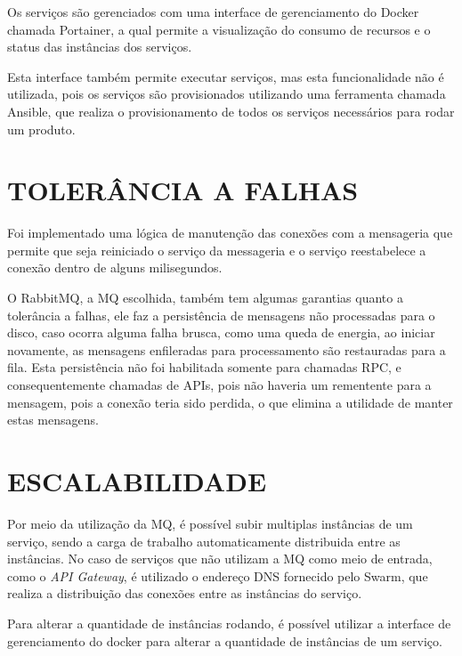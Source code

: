 Os serviços são gerenciados com uma interface de gerenciamento do Docker chamada
Portainer, a qual permite a visualização do consumo de recursos e o status das
instâncias dos serviços.

Esta interface também permite executar serviços, mas esta funcionalidade não é
utilizada, pois os serviços são provisionados utilizando uma ferramenta chamada
Ansible, que realiza o provisionamento de todos os serviços necessários para
rodar um produto.

\section{TOLERÂNCIA A FALHAS}

Foi implementado uma lógica de manutenção das conexões com a mensageria que permite
que seja reiniciado o serviço da messageria e o serviço reestabelece a conexão dentro
de alguns milisegundos.

O RabbitMQ, a \ac{MQ} escolhida, também tem algumas garantias quanto a tolerância a
falhas, ele faz a persistência de mensagens não processadas para o disco, caso ocorra
alguma falha brusca, como uma queda de energia, ao iniciar novamente, as mensagens
enfileradas para processamento são restauradas para a fila. Esta persistência não foi
habilitada somente para chamadas \ac{RPC}, e consequentemente chamadas de \acp{API},
pois não haveria um rementente para a mensagem, pois a conexão teria sido perdida,
o que elimina a utilidade de manter estas mensagens.

\section{ESCALABILIDADE}

Por meio da utilização da \ac{MQ}, é possível subir multiplas instâncias de um serviço,
sendo a carga de trabalho automaticamente distribuida entre as instâncias. No caso de
serviços que não utilizam a \ac{MQ} como meio de entrada, como o \emph{API Gateway},
é utilizado o endereço \ac{DNS} fornecido pelo Swarm, que realiza a distribuição das
conexões entre as instâncias do serviço.

Para alterar a quantidade de instâncias rodando, é possível utilizar a interface de
gerenciamento do docker para alterar a quantidade de instâncias de um serviço.

